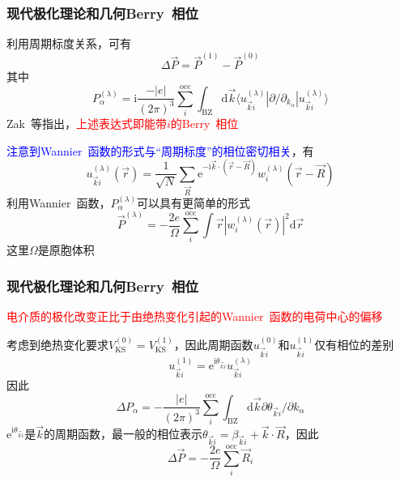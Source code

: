 \documentclass[cjk,slidestop,compress,mathserif,blue]{beamer}
\newcommand{\upcite}[1]{\hspace{0ex}\textsuperscript{\cite{#1}}} %
\begin{document}
\frame
{
	\frametitle{现代极化理论和几何\textrm{Berry~}相位}
	利用周期标度关系，可有
	\begin{displaymath}
		\Delta\vec P=\vec P^{(1)}-\vec P^{(0)}	
	\end{displaymath}
	其中
	\begin{displaymath}
		P_{\alpha}^{(\lambda)}=\mathrm{i}\frac{-|e|}{(2\pi)^3}\sum_i^{\mathrm{occ}}\int_{\mathrm{BZ}}\mathrm{d}\vec k\langle u_{\vec k i}^{(\lambda)}|\partial/\partial_{k_{\alpha}}|u_{\vec k i}^{(\lambda)}\rangle
	\end{displaymath}
	\textrm{Zak~}等指出，\textcolor{red}{上述表达式即能带$i$的\textrm{Berry~}相位}%
	
	\textcolor{blue}{注意到\textrm{Wannier~}函数的形式与“周期标度”的相位密切相关}，有
	\begin{displaymath}
		u_{\vec k i}^{(\lambda)}(\vec r)=\frac 1{\sqrt N}\sum_{\vec R}\mathrm{e}^{-\mathrm{i}\vec k\cdot(\vec r-\vec R)}w_i^{(\lambda)}(\vec r-\vec R)
	\end{displaymath}
	利用\textrm{Wannier~}函数，$P_{\alpha}^{(\lambda)}$可以具有更简单的形式
	\begin{displaymath}
		\vec P^{(\lambda)}=-\frac{2e}{\Omega}\sum_i^{\mathrm{occ}}\int\vec r|w_i^{(\lambda)}(\vec r)|^2\mathrm{d}\vec r
	\end{displaymath}
	这里$\Omega$是原胞体积
}

\frame
{
	\frametitle{现代极化理论和几何\textrm{Berry~}相位}
	\textcolor{red}{电介质的极化改变正比于由绝热变化引起的\textrm{Wannier~}函数的电荷中心的偏移}

	考虑到绝热变化要求$V_{\mathrm{KS}}^{(0)}=V_{\mathrm{KS}}^{(1)}$，因此周期函数$u_{\vec k i}^{(0)}$和$u_{\vec k i}^{(1)}$仅有相位的差别
	\begin{displaymath}
		u_{\vec k i}^{(1)}=\mathrm{e}^{\mathrm{i}\theta_{\vec k i}}u_{\vec k i}^{(\lambda)}
	\end{displaymath}
	因此
	\begin{displaymath}
		\Delta P_{\alpha}=-\frac{|e|}{(2\pi)^3}\sum_i^{\mathrm{occ}}\int_{\mathrm{BZ}}\mathrm{d}\vec k\partial\theta_{\vec k i}/\partial k_{\alpha}
	\end{displaymath}
	$\mathrm{e}^{\mathrm{i}\theta_{\vec k i}}$是$\vec k$的周期函数，最一般的相位表示$\theta_{\vec k i}=\beta_{\vec k i}+\vec k\cdot\vec R$，因此
	\begin{displaymath}
		\Delta\vec P=-\frac{2e}{\Omega}\sum_i^{\mathrm{occ}}\vec R_i
	\end{displaymath}
}
\end{document}
